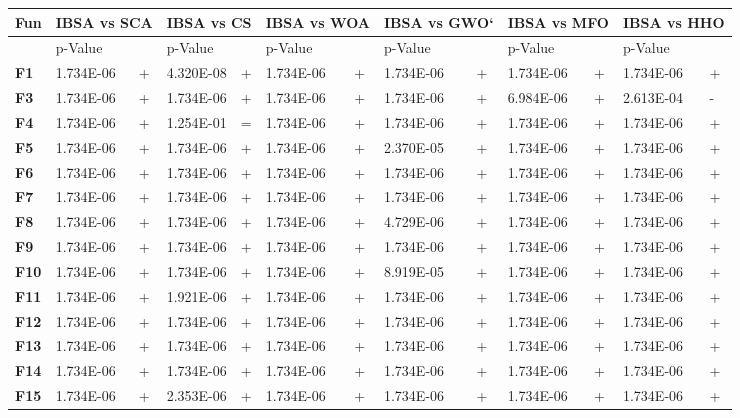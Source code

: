 \documentclass{article} %
\begin{document}
\begin{tabular}{|p{0.3in}|p{0.7in}|p{0.2in}|p{0.7in}|p{0.2in}|p{0.7in}|p{0.2in}|p{0.5in}|p{0.2in}|p{0.5in}|p{0.2in}|p{0.6in}|p{0.2in}|}
Fun & \multicolumn{2}{|p{0.9in}|}{IBSA vs SCA} & \multicolumn{2}{|p{0.9in}|}{IBSA vs CS} & \multicolumn{2}{|p{0.9in}|}{IBSA vs WOA} & \multicolumn{2}{|p{0.8in}|}{IBSA vs GWO`} & \multicolumn{2}{|p{0.8in}|}{IBSA vs MFO} & \multicolumn{2}{|p{0.9in}|}{IBSA vs HHO} \\ \hline 
 & p-Value &  & p-Value &  & p-Value &  & p-Value &  & p-Value &  & p-Value &  \\ \hline 
\textbf{F1} & 1.734E-06 & + & 4.320E-08 & + & 1.734E-06 & + & 1.734E-06 & + & 1.734E-06 & + & 1.734E-06 & + \\ \hline 
\textbf{F3} & 1.734E-06 & + & 1.734E-06 & + & 1.734E-06 & + & 1.734E-06 & + & 6.984E-06 & + & 2.613E-04 & - \\ \hline 
\textbf{F4} & 1.734E-06 & + & 1.254E-01 &  = & 1.734E-06 & + & 1.734E-06 & + & 1.734E-06 & + & 1.734E-06 & + \\ \hline 
\textbf{F5} & 1.734E-06 & + & 1.734E-06 & + & 1.734E-06 & + & 2.370E-05 & + & 1.734E-06 & + & 1.734E-06 & + \\ \hline 
\textbf{F6} & 1.734E-06 & + & 1.734E-06 & + & 1.734E-06 & + & 1.734E-06 & + & 1.734E-06 & + & 1.734E-06 & + \\ \hline 
\textbf{F7} & 1.734E-06 & + & 1.734E-06 & + & 1.734E-06 & + & 1.734E-06 & + & 1.734E-06 & + & 1.734E-06 & + \\ \hline 
\textbf{F8} & 1.734E-06 & + & 1.734E-06 & + & 1.734E-06 & + & 4.729E-06 & + & 1.734E-06 & + & 1.734E-06 & + \\ \hline 
\textbf{F9} & 1.734E-06 & + & 1.734E-06 & + & 1.734E-06 & + & 1.734E-06 & + & 1.734E-06 & + & 1.734E-06 & + \\ \hline 
\textbf{F10} & 1.734E-06 & + & 1.734E-06 & + & 1.734E-06 & + & 8.919E-05 & + & 1.734E-06 & + & 1.734E-06 & + \\ \hline 
\textbf{F11} & 1.734E-06 & + & 1.921E-06 & + & 1.734E-06 & + & 1.734E-06 & + & 1.734E-06 & + & 1.734E-06 & + \\ \hline 
\textbf{F12} & 1.734E-06 & + & 1.734E-06 & + & 1.734E-06 & + & 1.734E-06 & + & 1.734E-06 & + & 1.734E-06 & + \\ \hline 
\textbf{F13} & 1.734E-06 & + & 1.734E-06 & + & 1.734E-06 & + & 1.734E-06 & + & 1.734E-06 & + & 1.734E-06 & + \\ \hline 
\textbf{F14} & 1.734E-06 & + & 1.734E-06 & + & 1.734E-06 & + & 1.734E-06 & + & 1.734E-06 & + & 1.734E-06 & + \\ \hline 
\textbf{F15} & 1.734E-06 & + & 2.353E-06 & + & 1.734E-06 & + & 1.734E-06 & + & 1.734E-06 & + & 1.734E-06 & + \\ \hline 

\end{tabular}
\end{document}
